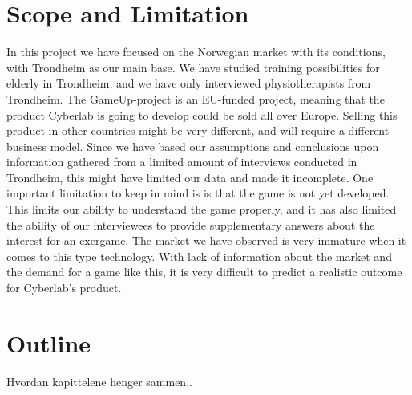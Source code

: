 \section{Scope and Limitation}
In this project we have focused on the Norwegian market with its conditions, with Trondheim as our main base. We have studied training possibilities for elderly in Trondheim, and we have only interviewed physiotherapists from Trondheim. The GameUp-project is an EU-funded project, meaning that the product Cyberlab is going to develop could be sold all over Europe.  Selling this product in other countries might be very different, and will require a different business model. Since we have based our assumptions and conclusions upon information gathered from a limited amount of interviews conducted in Trondheim, this might have limited our data and made it incomplete. One important limitation to keep in mind is is that the game is not yet developed. This limits our ability to understand the game properly, and it has also limited the ability of our interviewees to provide supplementary answers about the interest for an exergame.  The market we have observed is very immature when it comes to this type technology. With lack of information about the market and the demand for a game like this, it is very difficult to predict a realistic outcome for Cyberlab’s product.

\section{Outline}
Hvordan kapittelene henger sammen..